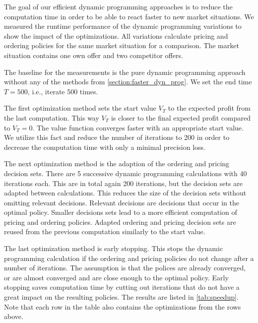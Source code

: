 The goal of our efficient dynamic programming approaches is to reduce the computation time in order to be able to react faster to new market situations.
We measured the runtime performance of the dynamic programming variations to show the impact of the optimizations.
All variations calculate pricing and ordering policies for the same market situation for a comparison.
The market situation contains one own offer and two competitor offers.


The baseline for the measurements is the pure dynamic programming approach without any of the methods from \cref{section:faster_dyn_prog}.
We set the end time $T = 500$, i.e., iterate 500 times.

The first optimization method sets the start value $V_T$ to the expected profit from the last computation.
This way $V_T$ is closer to the final expected profit compared to $V_T = 0$.
The value function converges faster with an appropriate start value.
We utilize this fact and reduce the number of iterations to 200 in order to decrease the computation time with only a minimal precision loss.

The next optimization method is the adaption of the ordering and pricing decision sets.
There are 5 successive dynamic programming calculations with 40 iterations each.
This are in total again 200 iterations, but the decision sets are adapted between calculations.
This reduces the size of the decision sets without omitting relevant decisions.
Relevant decisions are decisions that occur in the optimal policy.
Smaller decisions sets lead to a more efficient computation of pricing and ordering policies.
Adapted ordering and pricing decision sets are reused from the previous computation similarly to the start value.

The last optimization method is early stopping.
This stops the dynamic programming calculation if the ordering and pricing policies do not change after a number of iterations.
The assumption is that the polices are already converged, or are almost converged and are close enough to the optimal policy.
Early stopping saves computation time by cutting out iterations that do not have a great impact on the resulting policies.
The results are listed in \cref{tab:speedup}.
Note that each row in the table also contains the optimizations from the rows above.

